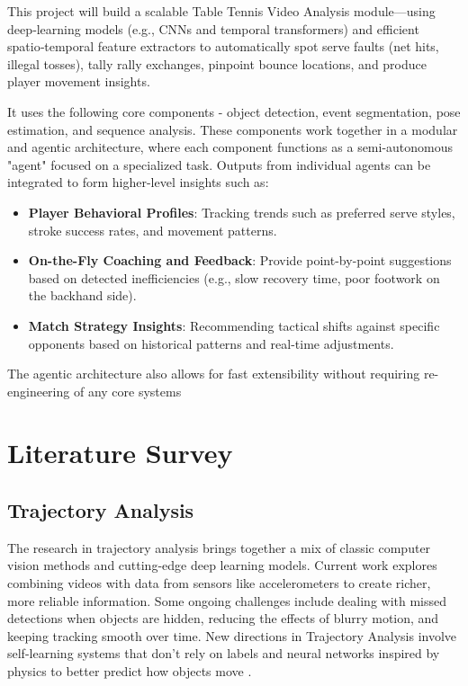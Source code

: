 \documentclass[conference]{IEEEtran}
\begin{document}
This project will build a scalable Table Tennis Video Analysis module—using deep‑learning models (e.g., CNNs and temporal transformers) and efficient spatio‑temporal feature extractors to automatically spot serve faults (net hits, illegal tosses), tally rally exchanges, pinpoint bounce locations, and produce player movement insights.

It uses the following core components - object detection, event segmentation, pose estimation, and sequence analysis. These components work together in a modular and agentic architecture, where each component functions as a semi-autonomous "agent" focused on a specialized task. Outputs from individual agents can be integrated to form higher-level insights such as:

\begin{itemize}
    \item \textbf{Player Behavioral Profiles}: Tracking trends such as preferred serve styles, stroke success rates, and movement patterns.

    \item \textbf{On-the-Fly Coaching and Feedback}: Provide point-by-point suggestions based on detected inefficiencies (e.g., slow recovery time, poor footwork on the backhand side).

    \item \textbf{Match Strategy Insights}: Recommending tactical shifts against specific opponents based on historical patterns and real-time adjustments.
\end{itemize}
The agentic architecture also allows for fast extensibility without requiring re-engineering of any core systems


\section{Literature Survey}

\subsection{Trajectory Analysis}

The research in trajectory analysis brings together a mix of classic computer vision methods and cutting-edge deep learning models. Current work explores combining videos with data from sensors like accelerometers  to create richer, more reliable information. Some ongoing challenges include dealing with missed detections when objects are hidden, reducing the effects of blurry motion, and keeping tracking smooth over time. New directions in Trajectory Analysis involve self-learning systems that don't rely on labels and neural networks inspired by physics to better predict how objects move \cite{pongball}.
\end{document}
